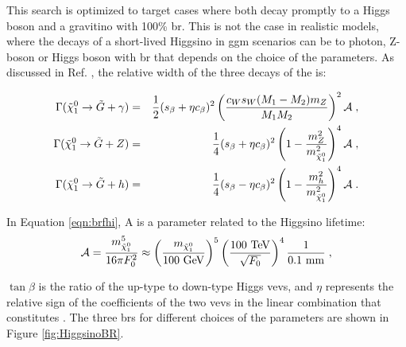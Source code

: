 This search is optimized to target cases where both \hino decay promptly to a Higgs boson and a gravitino with 100\% \gls{br}.
This is not the case in realistic models, where the decays of a short-lived Higgsino in \gls{ggm} scenarios  
can be to photon, Z-boson or Higgs boson with 
\gls{br} that depends on the choice of the parameters.
As discussed in Ref. \cite{Meade:2009qv}, the relative width of the three decays of the \ninoone is:

\begin{eqnarray}
\label{eqn:brfhi}
\Gamma(\tilde\chi_1^0\to \tilde G+\gamma)&=& {1\over2}(s_\beta+\eta c_\beta)^2\left({c_Ws_W(M_1-M_2)m_Z\over M_1 M_2}\right)^2 {\cal A} \;,
\nonumber\\
 \Gamma(\tilde\chi_1^0\to \tilde G+Z)&=&{1\over4}(s_\beta+\eta c_\beta)^2\left(1 - \frac{m_Z^2}{m^2_{\tilde{\chi}^0_1}}\right)^4 {\cal A} \;,\\
  \Gamma(\tilde\chi_1^0\to \tilde G+h)&=&{1\over4}(s_\beta-\eta c_\beta)^2\left(1 - \frac{m_h^2}{m^2_{\tilde{\chi}^0_1}}\right)^4 {\cal A} \;. \nonumber
\end{eqnarray}

\noindent In Equation \ref{eqn:brfhi}, {\cal A} is a parameter related to the Higgsino lifetime:
\begin{equation}
\label{eqn:decaylength}
{\cal A} = \frac{m^5_{\tilde{\chi}^0_1}}{16\pi F_0^2} \approx \left(\frac{m_{\tilde{\chi}^0_1}}{100~{\rm GeV}}\right)^5 \left(\frac{100~\rm{TeV}}{\sqrt{F_0}}\right)^4 \frac{1}{0.1~{\rm mm}} \;,
\end{equation}

\noindent $\tan \beta$ is the ratio of the up-type to down-type Higgs \glspl{vev}, and $\eta$ represents the relative sign of the coefficients 
of the two \glspl{vev} in the linear combination that constitutes \ninoone. 
The three \glspl{br} for different choices of the parameters are shown in Figure \ref{fig:HiggsinoBR}.

